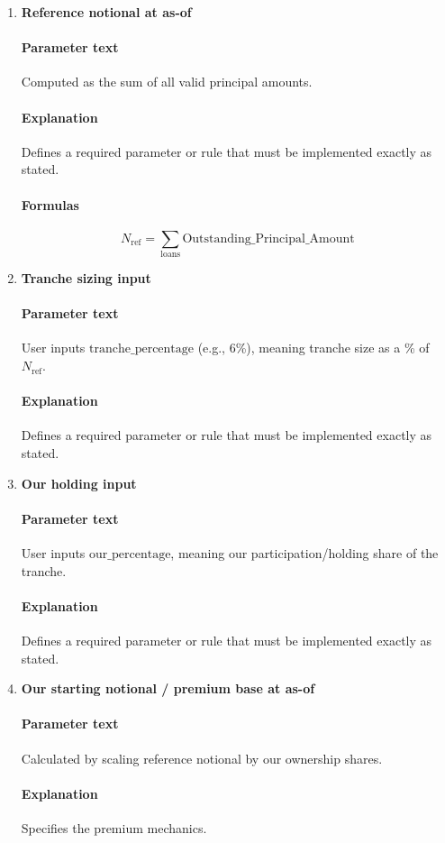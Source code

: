 \documentclass[11pt]{article}
\begin{document}
\begin{enumerate}[label=\arabic*),leftmargin=*,align=left]
\item \textbf{Reference notional at as-of}
\paragraph{Parameter text} Computed as the sum of all valid principal amounts.
\paragraph{Explanation} Defines a required parameter or rule that must be implemented exactly as stated.
\paragraph{Formulas} 
\[ N_{\text{ref}} = \sum_{\text{loans}} \text{Outstanding\_Principal\_Amount} \]

\item \textbf{Tranche sizing input}
\paragraph{Parameter text} User inputs $\text{tranche\_percentage}$ (e.g., 6\%), meaning tranche size as a \% of $N_{\text{ref}}$.
\paragraph{Explanation} Defines a required parameter or rule that must be implemented exactly as stated.

\item \textbf{Our holding input}
\paragraph{Parameter text} User inputs $\text{our\_percentage}$, meaning our participation/holding share of the tranche.
\paragraph{Explanation} Defines a required parameter or rule that must be implemented exactly as stated.

\item \textbf{Our starting notional / premium base at as-of}
\paragraph{Parameter text} Calculated by scaling reference notional by our ownership shares.
\paragraph{Explanation} Specifies the premium mechanics.

\end{enumerate}
\end{document}
